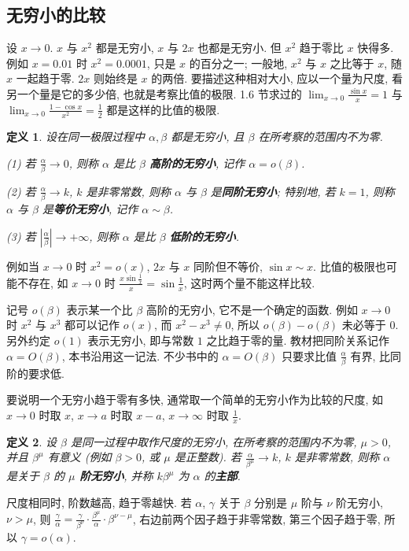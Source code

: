 \documentclass[UTF8,openany]{ctexbook}
\theoremstyle{chinesetextbook}
\newtheorem{definition}{定义}[section]
\begin{document}
\subsection{无穷小的比较}
设 $x\to0$. $x$ 与 $x^2$ 都是无穷小, $x$ 与 $2x$ 也都是无穷小. 但 $x^2$ 趋于零比 $x$ 快得多. 例如 $x=0.01$ 时 $x^2=0.0001$, 只是 $x$ 的百分之一; 一般地, $x^2$ 与 $x$ 之比等于 $x$, 随 $x$ 一起趋于零. $2x$ 则始终是 $x$ 的两倍. 要描述这种相对大小, 应以一个量为尺度, 看另一个量是它的多少倍, 也就是考察比值的极限. 1.6 节求过的 $\displaystyle\lim_{x\to0}\frac{\sin x}x=1$ 与 $\displaystyle\lim_{x\to0}\frac{1-\cos x}{x^2}=\frac12$ 都是这样的比值的极限.
\begin{definition}
设在同一极限过程中 $\alpha,\beta$ 都是无穷小, 且 $\beta$ 在所考察的范围内不为零.

\textup{(1)} 若 $\displaystyle\frac\alpha\beta\to0$, 则称 $\alpha$ 是比 $\beta$ \textbf{高阶的无穷小}, 记作 $\alpha=o(\beta)$.

\textup{(2)} 若 $\displaystyle\frac\alpha\beta\to k$, $k$ 是非零常数, 则称 $\alpha$ 与 $\beta$ 是\textbf{同阶无穷小}; 特别地, 若 $k=1$, 则称 $\alpha$ 与 $\beta$ 是\textbf{等价无穷小}, 记作 $\alpha\sim\beta$.

\textup{(3)} 若 $\displaystyle\left|\frac\alpha\beta\right|\to+\infty$, 则称 $\alpha$ 是比 $\beta$ \textbf{低阶的无穷小}.
\end{definition}
例如当 $x\to0$ 时 $x^2=o(x)$, $2x$ 与 $x$ 同阶但不等价, $\sin x\sim x$. 比值的极限也可能不存在, 如 $x\to0$ 时 $\displaystyle\frac{x\sin\frac1x}x=\sin\frac1x$, 这时两个量不能这样比较.

记号 $o(\beta)$ 表示某一个比 $\beta$ 高阶的无穷小, 它不是一个确定的函数. 例如 $x\to0$ 时 $x^2$ 与 $x^3$ 都可以记作 $o(x)$, 而 $x^2-x^3\ne0$, 所以 $o(\beta)-o(\beta)$ 未必等于 $0$. 另外约定 $o(1)$ 表示无穷小, 即与常数 $1$ 之比趋于零的量. 教材把同阶关系记作 $\alpha=O(\beta)$, 本书沿用这一记法. 不少书中的 $\alpha=O(\beta)$ 只要求比值 $\displaystyle\frac\alpha\beta$ 有界, 比同阶的要求低.

要说明一个无穷小趋于零有多快, 通常取一个简单的无穷小作为比较的尺度, 如 $x\to0$ 时取 $x$, $x\to a$ 时取 $x-a$, $x\to\infty$ 时取 $\displaystyle\frac1x$.
\begin{definition}
设 $\beta$ 是同一过程中取作尺度的无穷小, 在所考察的范围内不为零, $\mu>0$, 并且 $\beta^\mu$ 有意义 (例如 $\beta>0$, 或 $\mu$ 是正整数). 若 $\displaystyle\frac\alpha{\beta^\mu}\to k$, $k$ 是非零常数, 则称 $\alpha$ 是关于 $\beta$ 的 \textbf{$\mu$ 阶无穷小}, 并称 $k\beta^\mu$ 为 $\alpha$ 的\textbf{主部}.
\end{definition}
尺度相同时, 阶数越高, 趋于零越快. 若 $\alpha$, $\gamma$ 关于 $\beta$ 分别是 $\mu$ 阶与 $\nu$ 阶无穷小, $\nu>\mu$, 则 $\displaystyle\frac\gamma\alpha=\frac\gamma{\beta^\nu}\cdot\frac{\beta^\mu}\alpha\cdot\beta^{\nu-\mu}$, 右边前两个因子趋于非零常数, 第三个因子趋于零, 所以 $\gamma=o(\alpha)$.
\end{document}
